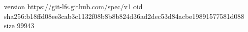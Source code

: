 version https://git-lfs.github.com/spec/v1
oid sha256:b18ffd08ee3cab3c1132f08b8b8b824d36ad2dec53d84acbe19891577581d088
size 99943
